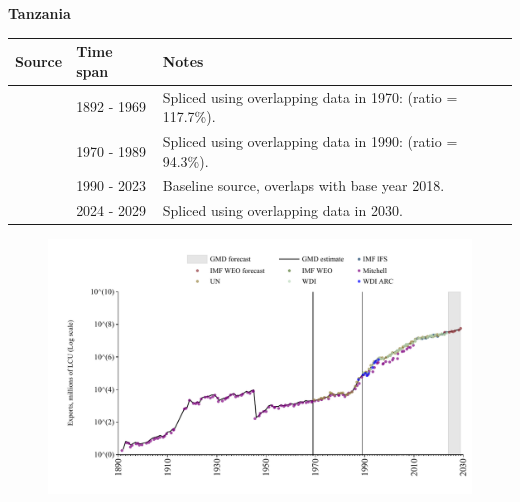 \documentclass[12pt,a4paper,landscape]{article}
\begin{document}
\begin{adjustbox}{max totalsize={\paperwidth}{\paperheight},center}
\begin{minipage}[t][\textheight][t]{\textwidth}
\vspace*{0.5cm}
{}
\begin{center}
{\Large\bfseries Tanzania}
\end{center}
\vspace{0.5cm}
\begin{table}[H]
\centering
\small
\begin{tabular}{|l|l|l|}
\hline
\textbf{Source} & \textbf{Time span} & \textbf{Notes} \\
\hline
\rowcolor{white}\cite{Mitchell}& 1892 - 1969 &Spliced using overlapping data in 1970: (ratio = 117.7\%).\\
\rowcolor{lightgray}\cite{UN}& 1970 - 1989 &Spliced using overlapping data in 1990: (ratio = 94.3\%).\\
\rowcolor{white}\cite{WDI}& 1990 - 2023 &Baseline source, overlaps with base year 2018.\\
\rowcolor{lightgray}\cite{IMF_WEO_forecast}& 2024 - 2029 &Spliced using overlapping data in 2030.\\
\hline
\end{tabular}
\end{table}
\begin{figure}[H]
\centering
\includegraphics[width=\textwidth,height=0.6\textheight,keepaspectratio]{graphs/TZA_exports.pdf}
\end{figure}
\end{minipage}
\end{adjustbox}
\end{document}
